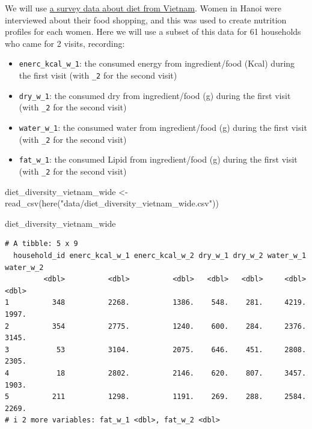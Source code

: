 \documentclass[
  letterpaper,
  DIV=11,
  numbers=noendperiod]{scrreprt}
\newenvironment{Shaded}{\begin{snugshade}}{\end{snugshade}}
\newcommand{\FunctionTok}[1]{\textcolor[rgb]{0.28,0.35,0.67}{#1}}
\newcommand{\NormalTok}[1]{\textcolor[rgb]{0.00,0.23,0.31}{#1}}
\newcommand{\OtherTok}[1]{\textcolor[rgb]{0.00,0.23,0.31}{#1}}
\newcommand{\StringTok}[1]{\textcolor[rgb]{0.13,0.47,0.30}{#1}}
\begin{document}
\begin{tcolorbox}[enhanced jigsaw, titlerule=0mm, colback=white, left=2mm, breakable, opacitybacktitle=0.6, colbacktitle=quarto-callout-tip-color!10!white, colframe=quarto-callout-tip-color-frame, bottomtitle=1mm, opacityback=0, coltitle=black, arc=.35mm, toptitle=1mm, title=\textcolor{quarto-callout-tip-color}{\faLightbulb}\hspace{0.5em}{Practice}, leftrule=.75mm, toprule=.15mm, bottomrule=.15mm, rightrule=.15mm]

We will use
\href{https://www.wur.nl/en/project/Retail-Diversity-for-Dietary-Diversity-RD4DD.htm}{a
survey data about diet from Vietnam}. Women in Hanoi were interviewed
about their food shopping, and this was used to create nutrition
profiles for each women. Here we will use a subset of this data for 61
households who came for 2 visits, recording:

\begin{itemize}
\item
  \texttt{enerc\_kcal\_w\_1}: the consumed energy from ingredient/food
  (Kcal) during the first visit (with \texttt{\_2} for the second visit)
\item
  \texttt{dry\_w\_1}: the consumed dry from ingredient/food (g) during
  the first visit (with \texttt{\_2} for the second visit)
\item
  \texttt{water\_w\_1}: the consumed water from ingredient/food (g)
  during the first visit (with \texttt{\_2} for the second visit)
\item
  \texttt{fat\_w\_1}: the consumed Lipid from ingredient/food (g) during
  the first visit (with \texttt{\_2} for the second visit)
\end{itemize}

\begin{Shaded}
\begin{Highlighting}[]
\NormalTok{diet\_diversity\_vietnam\_wide }\OtherTok{\textless{}{-}} \FunctionTok{read\_csv}\NormalTok{(}\FunctionTok{here}\NormalTok{(}\StringTok{"data/diet\_diversity\_vietnam\_wide.csv"}\NormalTok{))}

\NormalTok{diet\_diversity\_vietnam\_wide}
\end{Highlighting}
\end{Shaded}

\begin{verbatim}
# A tibble: 5 x 9
  household_id enerc_kcal_w_1 enerc_kcal_w_2 dry_w_1 dry_w_2 water_w_1 water_w_2
         <dbl>          <dbl>          <dbl>   <dbl>   <dbl>     <dbl>     <dbl>
1          348          2268.          1386.    548.    281.     4219.     1997.
2          354          2775.          1240.    600.    284.     2376.     3145.
3           53          3104.          2075.    646.    451.     2808.     2305.
4           18          2802.          2146.    620.    807.     3457.     1903.
5          211          1298.          1191.    269.    288.     2584.     2269.
# i 2 more variables: fat_w_1 <dbl>, fat_w_2 <dbl>
\end{verbatim}


\end{tcolorbox}
\end{document}
